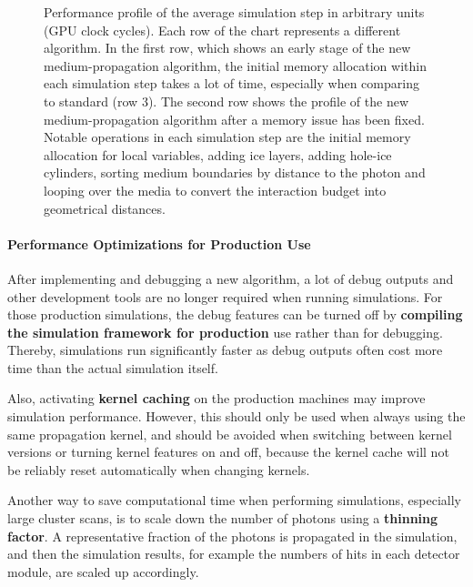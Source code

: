 
\begin{figure}[htbp]
  \caption{Performance profile of the average simulation step in arbitrary units (GPU clock cycles). Each row of the chart represents a different algorithm. In the first row, which shows an early stage of the new medium-propagation algorithm, the initial memory allocation within each simulation step takes a lot of time, especially when comparing to standard \clsim (row 3). The second row shows the profile of the new medium-propagation algorithm after a memory issue has been fixed. Notable operations in each simulation step are the initial memory allocation for local variables, adding ice layers, adding hole-ice cylinders, sorting medium boundaries by distance to the photon and looping over the media to convert the interaction budget into geometrical distances.}
  \label{fig:profiling-paz4Eig6}
\end{figure}

\paragraph{Performance Optimizations for Production Use}

After implementing and debugging a new algorithm, a lot of debug outputs
and other development tools are no longer required when running
simulations. For those production simulations, the debug features can be
turned off by
\textbf{compiling the \icecube simulation framework for production} use
rather than for debugging. Thereby, simulations run significantly faster
as debug outputs often cost more time than the actual simulation itself.

Also, activating \textbf{kernel caching} on the production machines may
improve simulation performance. However, this should only be used when
always using the same propagation kernel, and should be avoided when
switching between kernel versions or turning kernel features on and off,
because the kernel cache will not be reliably reset automatically when
changing kernels.

\label{sec:thinning} Another way to save computational time when
performing simulations, especially large cluster scans, is to scale down
the number of photons using a \textbf{thinning factor}. A representative
fraction of the photons is propagated in the simulation, and then the
simulation results, for example the numbers of hits in each detector
module, are scaled up accordingly.

